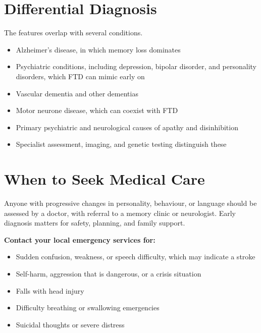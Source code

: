 \section*{Differential Diagnosis}
The features overlap with several conditions.
\begin{itemize}
    \item Alzheimer's disease, in which memory loss dominates
    \item Psychiatric conditions, including depression, bipolar disorder, and personality disorders, which FTD can mimic early on
    \item Vascular dementia and other dementias
    \item Motor neurone disease, which can coexist with FTD
    \item Primary psychiatric and neurological causes of apathy and disinhibition
    \item Specialist assessment, imaging, and genetic testing distinguish these
\end{itemize}

\section*{When to Seek Medical Care}
Anyone with progressive changes in personality, behaviour, or language should be assessed by a doctor, with referral to a memory clinic or neurologist. Early diagnosis matters for safety, planning, and family support.

\textbf{Contact your local emergency services for:}
\begin{itemize}
    \item Sudden confusion, weakness, or speech difficulty, which may indicate a stroke
    \item Self-harm, aggression that is dangerous, or a crisis situation
    \item Falls with head injury
    \item Difficulty breathing or swallowing emergencies
    \item Suicidal thoughts or severe distress
\end{itemize}

